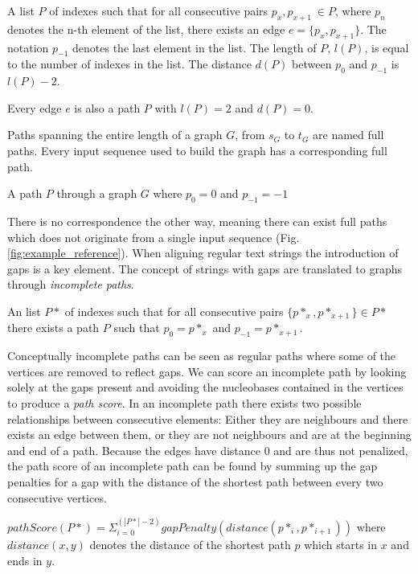 \documentclass[thesis.tex]{subfiles}
\begin{document}
{\begin{defn}
  A list $P$ of indexes such that for all consecutive pairs $p_x, p_{x+1}\ \in P$, where $p_n$ denotes the n-th element of the list, there exists an edge $e=\{p_x, p_{x+1}\}$. The notation $p_{-1}$ denotes the last element in the list. The length of $P$, $l(P)$, is equal to the number of indexes in the list. The distance $d(P)$ between $p_0$ and $p_{-1}$ is $l(P) - 2$.
\end{defn}
\begin{corollary}
  Every edge $e$ is also a path $P$ with $l(P)=2$ and $d(P)=0$.
\end{corollary}
Paths spanning the entire length of a graph $G$, from $s_G$ to $t_G$ are named full paths. Every input sequence used to build the graph has a corresponding full path.
\begin{defn}
  A path $P$ through a graph $G$ where $p_0=0$ and $p_{-1}=-1$
\end{defn}
There is no correspondence the other way, meaning there can exist full paths which does not originate from a single input sequence (Fig. \ref{fig:example_reference}). When aligning regular text strings the introduction of gaps is a key element. The concept of strings with gaps are translated to graphs through \textit{incomplete paths}.
\begin{defn}
  An list $P*$ of indexes such that for all consecutive pairs $\{p*_x, p*_{x+1}\} \in P*$ there exists a path $P$ such that $p_0=p*_x$ and $p_{-1}=p*_{x+1}$.
\end{defn}
Conceptually incomplete paths can be seen as regular paths where some of the vertices are removed to reflect gaps. We can score an incomplete path by looking solely at the gaps present and avoiding the nucleobases contained in the vertices to produce a \textit{path score}. In an incomplete path there exists two possible relationships between consecutive elements: Either they are neighbours and there exists an edge between them, or they are not neighbours and are at the beginning and end of a path. Because the edges have distance $0$ and are thus not penalized, the path score of an incomplete path can be found by summing up the gap penalties for a gap with the distance of the shortest path between every two consecutive vertices.
\begin{defn}
  $pathScore(P*)=\Sigma^(|P*|-2)_{i=0} gapPenalty(distance(p*_i, p*_{i+1}))$ where $distance(x, y)$ denotes the distance of the shortest path $p$ which starts in $x$ and ends in $y$.

\end{defn}}
\end{document}
